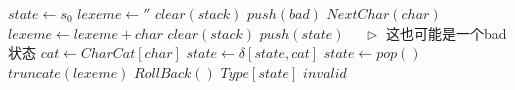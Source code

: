 \documentclass[varwidth=\maxdimen]{standalone}
\newcommand{\LeftComment}[1]{$\quad\triangleright$ #1}
\begin{document}
\begin{algorithmic}[1]
  \State $state \gets s_0$
  \State $lexeme \gets ''$
  \State $clear(stack)$
  \State $push(bad)$
    \State $NextChar(char)$
    \State $lexeme \gets lexeme+char$
      \State $clear(stack)$
    \EndIf
    \State $push(state)$ \LeftComment{这也可能是一个bad状态}
    \State $cat \gets CharCat[char]$
    \State $state \gets \delta[state,cat]$
  \EndWhile
    \State $state \gets pop()$
    \State $truncate(lexeme)$
    \State $RollBack()$
  \EndWhile
    \StateReturn $Type[state]$
  \Else
    \StateReturn $invalid$
  \EndIf
  \EndFunction
\end{algorithmic}
\end{document}

